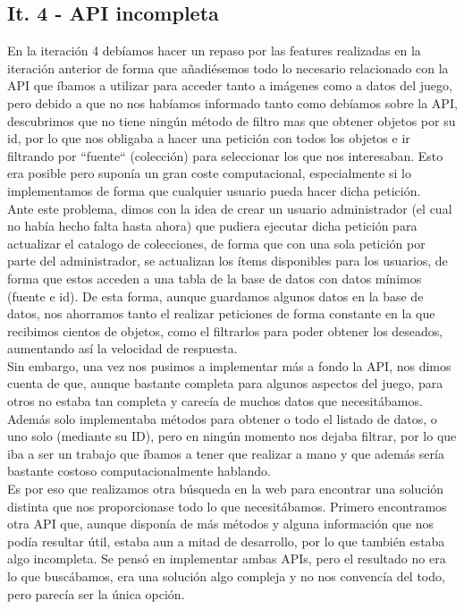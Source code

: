 \subsection{It. 4 - API incompleta}

En la iteración 4 debíamos hacer un repaso por las features realizadas en la iteración anterior de forma que añadiésemos todo lo necesario relacionado con la API que íbamos a utilizar \citep{acnhapi} para acceder tanto a imágenes como a datos del juego, pero debido a que no nos habíamos informado tanto como debíamos sobre la API, descubrimos que no tiene ningún método de filtro mas que obtener objetos por su id, por lo que nos obligaba a hacer una petición con todos los objetos e ir filtrando por ``fuente`` (colección) para seleccionar los que nos interesaban. Esto era posible pero suponía un gran coste computacional, especialmente si lo implementamos de forma que cualquier usuario pueda hacer dicha petición.\\

Ante este problema, dimos con la idea de crear un usuario administrador (el cual no había hecho falta hasta ahora) que pudiera ejecutar dicha petición para actualizar el catalogo de colecciones, de forma que con una sola petición por parte del administrador, se actualizan los ítems disponibles para los usuarios, de forma que estos acceden a una tabla de la base de datos con datos mínimos (fuente e id). De esta forma, aunque guardamos algunos datos en la base de datos, nos ahorramos tanto el realizar peticiones de forma constante en la que recibimos cientos de objetos, como el filtrarlos para poder obtener los deseados, aumentando así la velocidad de respuesta.\\

Sin embargo, una vez nos pusimos a implementar más a fondo la API, nos dimos cuenta de que, aunque bastante completa para algunos aspectos del juego, para otros no estaba tan completa y carecía de muchos datos que necesitábamos. Además solo implementaba métodos para obtener o todo el listado de datos, o uno solo (mediante su ID), pero en ningún momento nos dejaba filtrar, por lo que iba a ser un trabajo que íbamos a tener que realizar a mano y que además sería bastante costoso computacionalmente hablando.\\

Es por eso que realizamos otra búsqueda en la web para encontrar una solución distinta que nos proporcionase todo lo que necesitábamos. Primero encontramos otra API \citep{nookipediaapi} que, aunque disponía de más métodos y alguna información que nos podía resultar útil, estaba aun a mitad de desarrollo, por lo que también estaba algo incompleta. Se pensó en implementar ambas APIs, pero el resultado no era lo que buscábamos, era una solución algo compleja y no nos convencía del todo, pero parecía ser la única opción.\\

